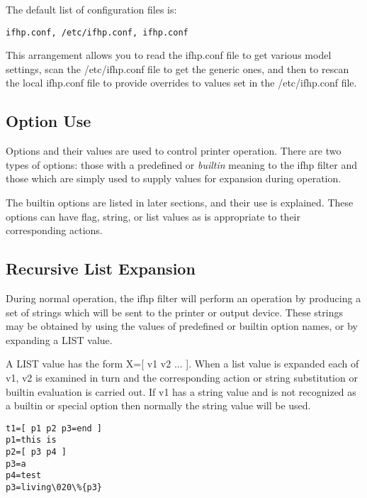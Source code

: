 \documentclass[a4paper]{article}
\begin{document}
The default list of configuration files is:
\begin{tscreen}
\begin{verbatim}
ifhp.conf, /etc/ifhp.conf, ifhp.conf
\end{verbatim}
\end{tscreen}


This arrangement allows you to read the ifhp.conf file to get
various model settings,  scan the /etc/ifhp.conf file to get the
generic ones,  and then to rescan the local ifhp.conf file to
provide overrides to values set in the /etc/ifhp.conf file.


\subsection{Option Use}

Options and their values are used to control printer operation.
There are two types of options:
those with a predefined or
{\itshape builtin\/}
meaning to the
{\ttfamily ifhp}
filter and those which
are simply used to supply values for expansion during operation.

The builtin options are listed in later sections,
and their use is explained.
These options can have flag, string, or list values as is appropriate
to their corresponding actions.


\subsection{Recursive List Expansion}

During normal operation,
the
{\ttfamily ifhp}
filter will perform an operation by producing a set of strings
which will be sent to the printer or output device.
These strings may be obtained by using the values of predefined or builtin
option names,
or by expanding a LIST value.

A LIST value has the form X={[} v1 v2 ... {]}.
When a list value is expanded
each of v1, v2 is examined in turn
and the corresponding action or string substitution or builtin evaluation
is carried out.
If v1 has a string value and is not recognized as a builtin or special option
then normally the string value will be used.
\begin{tscreen}
\begin{verbatim}
t1=[ p1 p2 p3=end ]
p1=this is
p2=[ p3 p4 ]
p3=a
p4=test
p3=living\020\%{p3}
\end{verbatim}
\end{tscreen}
\end{document}
